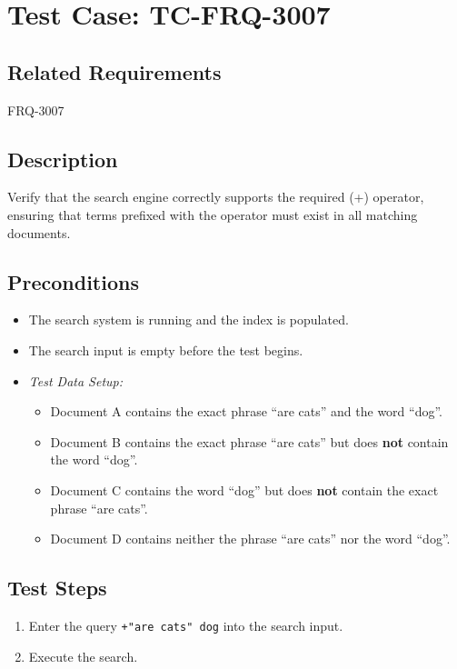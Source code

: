 \documentclass{article}
\begin{document}
\section{Test Case: TC-FRQ-3007}

\subsection*{Related Requirements}
FRQ-3007

\subsection*{Description}
Verify that the search engine correctly supports the required (+) operator, ensuring that terms prefixed with the operator must exist in all matching documents.

\subsection*{Preconditions}
\begin{itemize}
  \item The search system is running and the index is populated.
  \item The search input is empty before the test begins.
  \item[] \textit{Test Data Setup:}
  \begin{itemize}
      \item Document A contains the exact phrase ``are cats'' and the word ``dog''.
      \item Document B contains the exact phrase ``are cats'' but does \textbf{not} contain the word ``dog''.
      \item Document C contains the word ``dog'' but does \textbf{not} contain the exact phrase ``are cats''.
      \item Document D contains neither the phrase ``are cats'' nor the word ``dog''.
  \end{itemize}
\end{itemize}

\subsection*{Test Steps}
\begin{enumerate}
 \item Enter the query \texttt{+"are cats" dog} into the search input.
  \item Execute the search.
\end{enumerate}
\end{document}
